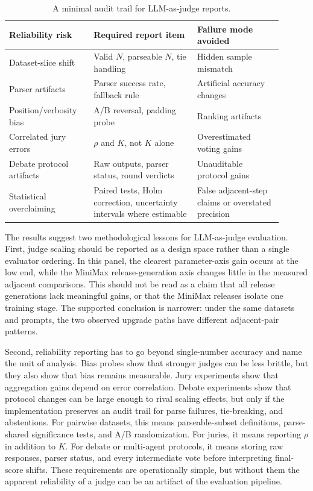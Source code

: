 \documentclass[sigconf,nonacm]{acmart}
\begin{document}
\begin{table}[H]
\centering
\caption{A minimal audit trail for LLM-as-judge reports.}
\label{tab:reporting}
\tiny
\setlength{\tabcolsep}{2pt}
\renewcommand{\arraystretch}{0.92}
\begin{tabular}{p{0.27\linewidth}p{0.34\linewidth}p{0.29\linewidth}}
\toprule
Reliability risk & Required report item & Failure mode avoided \\
\midrule
Dataset-slice shift & Valid $N$, parseable $N$, tie handling & Hidden sample mismatch \\
Parser artifacts & Parser success rate, fallback rule & Artificial accuracy changes \\
Position/verbosity bias & A/B reversal, padding probe & Ranking artifacts \\
Correlated jury errors & $\rho$ and $K$, not $K$ alone & Overestimated voting gains \\
Debate protocol artifacts & Raw outputs, parser status, round verdicts & Unauditable protocol gains \\
Statistical overclaiming & Paired tests, Holm correction, uncertainty intervals where estimable & False adjacent-step claims or overstated precision \\
\bottomrule
\end{tabular}
\end{table}

The results suggest two methodological lessons for LLM-as-judge evaluation. First, judge scaling should be reported as a design space rather than a single evaluator ordering. In this panel, the clearest parameter-axis gain occurs at the low end, while the MiniMax release-generation axis changes little in the measured adjacent comparisons. This should not be read as a claim that all release generations lack meaningful gains, or that the MiniMax releases isolate one training stage. The supported conclusion is narrower: under the same datasets and prompts, the two observed upgrade paths have different adjacent-pair patterns.

Second, reliability reporting has to go beyond single-number accuracy and name the unit of analysis. Bias probes show that stronger judges can be less brittle, but they also show that bias remains measurable. Jury experiments show that aggregation gains depend on error correlation. Debate experiments show that protocol changes can be large enough to rival scaling effects, but only if the implementation preserves an audit trail for parse failures, tie-breaking, and abstentions. For pairwise datasets, this means parseable-subset definitions, parse-shared significance tests, and A/B randomization. For juries, it means reporting $\rho$ in addition to $K$. For debate or multi-agent protocols, it means storing raw responses, parser status, and every intermediate vote before interpreting final-score shifts. These requirements are operationally simple, but without them the apparent reliability of a judge can be an artifact of the evaluation pipeline.
\end{document}
